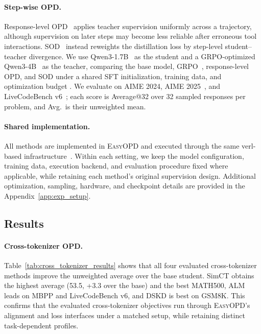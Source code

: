 \paragraph{Step-wise OPD.}
Response-level OPD~\citep{agarwal2024onpolicy_opsd} applies teacher supervision uniformly across a trajectory, although supervision on later steps may become less reliable after erroneous tool interactions. SOD~\citep{zhong2026sod} instead reweights the distillation loss by step-level student--teacher divergence. We use Qwen3-1.7B~\citep{qwen2025qwen3} as the student and a GRPO-optimized Qwen3-4B~\citep{zhong2026sod} as the teacher, comparing the base model, GRPO~\citep{shao2024deepseekmath}, response-level OPD, and SOD under a shared SFT initialization, training data, and optimization budget \citep{zhong2026sod}. We evaluate on AIME 2024, AIME 2025~\citep{maa_aime}, and LiveCodeBench v6~\citep{jain2024livecodebench}; each score is Average@32 over 32 sampled responses per problem, and Avg.\ is their unweighted mean.

\paragraph{Shared implementation.}
All methods are implemented in \textsc{EasyOPD} and executed through the same verl-based infrastructure~\citep{sheng2024hybridflow_verl}. Within each setting, we keep the model configuration, training data, execution backend, and evaluation procedure fixed where applicable, while retaining each method's original supervision design. Additional optimization, sampling, hardware, and checkpoint details are provided in the Appendix~\ref{app:exp_setup}.


\subsection{Results}
\label{sec:exp_results}

\paragraph{Cross-tokenizer OPD.}
Table~\ref{tab:cross_tokenizer_results} shows that all four evaluated cross-tokenizer methods improve the unweighted average over the base student. SimCT obtains the highest average (53.5, +3.3 over the base) and the best MATH500, ALM leads on MBPP and LiveCodeBench v6, and DSKD is best on GSM8K. This confirms that the evaluated cross-tokenizer objectives run through \textsc{EasyOPD}'s alignment and loss interfaces under a matched setup, while retaining distinct task-dependent profiles.



